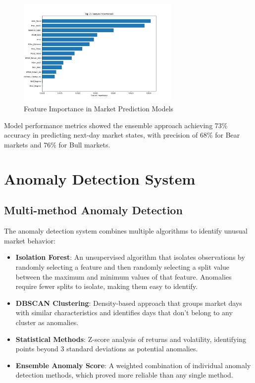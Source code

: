\documentclass[13pt]{article}
\begin{document}
\begin{figure}[htbp]
	\centering
	\includegraphics[width=0.7\textwidth]{../results/feature_importance.png}
	\caption{Feature Importance in Market Prediction Models}
	\label{fig:feature_importance}
\end{figure}

Model performance metrics showed the ensemble approach achieving 73\% accuracy in predicting next-day market states, with precision of 68\% for Bear markets and 76\% for Bull markets.

\section{Anomaly Detection System}
\subsection{Multi-method Anomaly Detection}
The anomaly detection system combines multiple algorithms to identify unusual market behavior:

\begin{itemize}
	\item \textbf{Isolation Forest}: An unsupervised algorithm that isolates observations by randomly selecting a feature and then randomly selecting a split value between the maximum and minimum values of that feature. Anomalies require fewer splits to isolate, making them easy to identify.

	\item \textbf{DBSCAN Clustering}: Density-based approach that groups market days with similar characteristics and identifies days that don't belong to any cluster as anomalies.

	\item \textbf{Statistical Methods}: Z-score analysis of returns and volatility, identifying points beyond 3 standard deviations as potential anomalies.

	\item \textbf{Ensemble Anomaly Score}: A weighted combination of individual anomaly detection methods, which proved more reliable than any single method.
\end{itemize}
\end{document}
